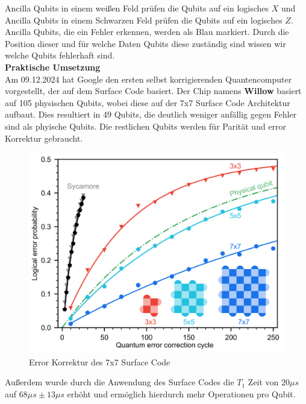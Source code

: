 Ancilla Qubits in einem weißen Feld prüfen die Qubits auf ein logisches $X$ und Ancilla Qubits in einem Schwarzen Feld prüfen die Qubits auf ein logisches $Z$.\\

Ancilla Qubits, die ein Fehler erkennen, werden als Blau markiert. Durch die Position dieser und für welche Daten Qubits diese zuständig sind wissen wir welche Qubits fehlerhaft sind.\\

\textbf{Praktische Umsetzung}\\
Am 09.12.2024 hat Google den ersten selbst korrigierenden Quantencomputer vorgestellt, der auf dem Surface Code basiert.
Der Chip namens \textbf{Willow} basiert auf 105 physischen Qubits, wobei diese auf der 7x7 Surface Code Architektur aufbaut.
Dies resultiert in 49 Qubits, die deutlich weniger anfällig gegen Fehler sind als phyische Qubits. Die restlichen Qubits werden für Parität und error Korrektur gebraucht.\\

\begin{figure}[H]
    \centering
    \includegraphics[width=0.7\linewidth]{img/Surface-Code-Scaling.png}
    \caption{Error Korrektur des 7x7 Surface Code}
    \label{fig:Willow}
\end{figure}

Außerdem wurde durch die Anwendung des Surface Codes die $T_1$ Zeit von $20\mu s$ auf $68\mu s\pm13\mu s$ erhöht und ermöglich hierdurch mehr Operationen pro Qubit.\\